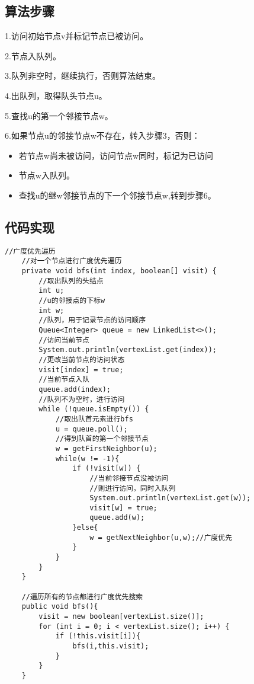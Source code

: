 \documentclass[a4paper]{report}
\begin{document}
\subsection{算法步骤}
1.访问初始节点v并标记节点已被访问。

2.节点入队列。

3.队列非空时，继续执行，否则算法结束。

4.出队列，取得队头节点u。

5.查找u的第一个邻接节点w。

6.如果节点u的邻接节点w不存在，转入步骤3，否则：
\begin{itemize}
  \item 若节点w尚未被访问，访问节点w同时，标记为已访问
  \item 节点w入队列。
  \item 查找u的继w邻接节点的下一个邻接节点w,转到步骤6。
\end{itemize}
\subsection{代码实现}
\begin{lstlisting}
//广度优先遍历
    //对一个节点进行广度优先遍历
    private void bfs(int index, boolean[] visit) {
        //取出队列的头结点
        int u;
        //u的邻接点的下标w
        int w;
        //队列，用于记录节点的访问顺序
        Queue<Integer> queue = new LinkedList<>();
        //访问当前节点
        System.out.println(vertexList.get(index));
        //更改当前节点的访问状态
        visit[index] = true;
        //当前节点入队
        queue.add(index);
        //队列不为空时，进行访问
        while (!queue.isEmpty()) {
            //取出队首元素进行bfs
            u = queue.poll();
            //得到队首的第一个邻接节点
            w = getFirstNeighbor(u);
            while(w != -1){
                if (!visit[w]) {
                    //当前邻接节点没被访问
                    //则进行访问，同时入队列
                    System.out.println(vertexList.get(w));
                    visit[w] = true;
                    queue.add(w);
                }else{
                    w = getNextNeighbor(u,w);//广度优先
                }
            }
        }
    }

    //遍历所有的节点都进行广度优先搜索
    public void bfs(){
        visit = new boolean[vertexList.size()];
        for (int i = 0; i < vertexList.size(); i++) {
            if (!this.visit[i]){
                bfs(i,this.visit);
            }
        }
    }
\end{lstlisting}
\end{document}
